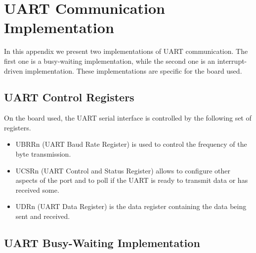 \chapter{UART Communication Implementation}\label{uart_implementation}

In this appendix we present two implementations of UART communication. The first one is a busy-waiting implementation, while the second one is an interrupt-driven implementation. These implementations are specific for the board used\supercite{mega2560_datasheet}.
\section{UART Control Registers}

On the board used, the UART serial interface is controlled by the following set of registers.
\begin{itemize}
	\item UBRRn (UART Baud Rate Register) is used to control the frequency of the byte transmission.
	\item UCSRn (UART Control and Status Register) allows to configure other aspects of the port and to poll if the UART is ready to transmit data or has received some.
	\item UDRn (UART Data Register) is the data register containing the data being sent and received.
\end{itemize}


\section{UART Busy-Waiting Implementation}\label{uart_bw}

